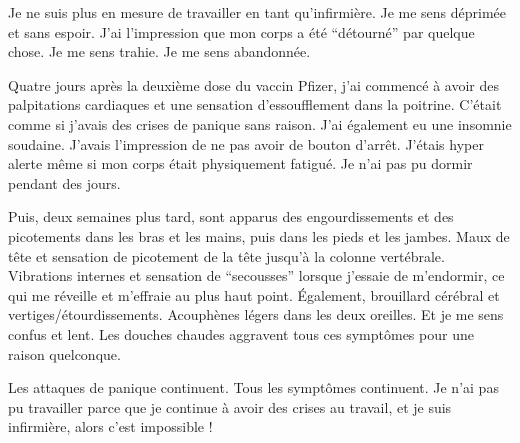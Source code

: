 Je ne suis plus en mesure de travailler en tant qu'infirmière. Je me sens
déprimée et sans espoir. J'ai l'impression que mon corps a été ``détourné'' par
quelque chose. Je me sens trahie. Je me sens abandonnée.

Quatre jours après la deuxième dose du vaccin Pfizer, j'ai commencé à avoir des
palpitations cardiaques et une sensation d'essoufflement dans la
poitrine. C'était comme si j'avais des crises de panique sans raison. J'ai
également eu une insomnie soudaine. J'avais l'impression de ne pas avoir de
bouton d'arrêt. J'étais hyper alerte même si mon corps était physiquement
fatigué. Je n'ai pas pu dormir pendant des jours.

Puis, deux semaines plus tard, sont apparus des engourdissements et des
picotements dans les bras et les mains, puis dans les pieds et les jambes. Maux
de tête et sensation de picotement de la tête jusqu'à la colonne
vertébrale. Vibrations internes et sensation de ``secousses'' lorsque j'essaie
de m'endormir, ce qui me réveille et m'effraie au plus haut point. Également,
brouillard cérébral et vertiges/étourdissements. Acouphènes légers dans les deux
oreilles. Et je me sens confus et lent. Les douches chaudes aggravent tous ces
symptômes pour une raison quelconque.

Les attaques de panique continuent. Tous les symptômes continuent. Je n'ai pas
pu travailler parce que je continue à avoir des crises au travail, et je suis
infirmière, alors c'est impossible !
